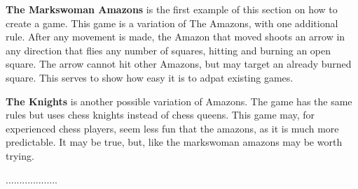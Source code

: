 
\textbf{The Markswoman Amazons} is the first example of this section on how to create a game. This game is a variation of The Amazons, with one additional rule. After any movement is made, the Amazon that moved shoots an arrow in any direction that flies any number of squares, hitting and burning an open square. The arrow cannot hit other Amazons, but may target an already burned square. This serves to show how easy it is to adpat existing games.

\textbf{The Knights} is another possible variation of Amazons. The game has the same rules but uses chess knights instead of chess queens. This game may, for experienced chess players, seem less fun that the amazons, as it is much more predictable. It may be true, but, like the markswoman amazons may be worth trying.

...................














